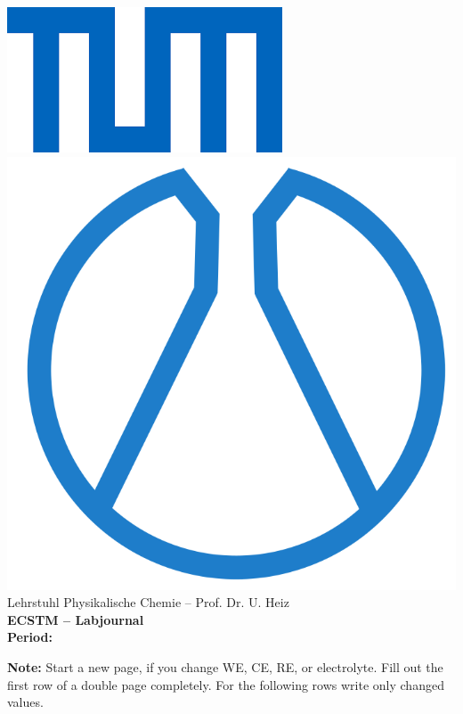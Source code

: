 \documentclass[fontsize=10pt, parskip]{scrreprt}
\begin{document}
	\thispagestyle{empty}
	\begin{center}
		\includegraphics[height=0.15\textheight]{logo.png}\hspace{5cm}
		\includegraphics[height=0.15\textheight]{tum_fac.png}\\\vspace{10mm}
		\Large{Lehrstuhl Physikalische Chemie -- Prof. Dr. U. Heiz}\\\vspace{20mm}
		\Huge{\textbf{ECSTM -- Labjournal}}\\\vspace{10mm}
		\Large{\textbf{Period:}}\hspace*{100mm}\vspace{45mm}
	\end{center}
	\begin{flushleft}
		\textbf{Note:} Start a new page, if you change WE, CE, RE, or electrolyte. Fill out the first row of a double page completely. For the following rows write only changed values.
	\end{flushleft}
	\clearpage~
	\thispagestyle{empty}
	\clearpage
	\setcounter{page}{1}
\end{document}
